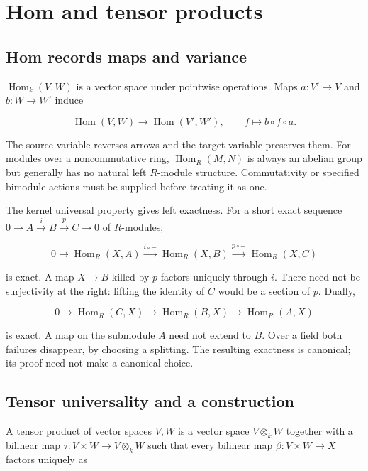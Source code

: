 \documentclass[
  11pt,
]{article}
\begin{document}
\section{Hom and tensor products}\label{hom-and-tensor-products}

\subsection{Hom records maps and
variance}\label{hom-records-maps-and-variance}

\(\operatorname{Hom}_k(V,W)\) is a vector space under pointwise
operations. Maps \(a:V'\to V\) and \(b:W\to W'\) induce

\[\operatorname{Hom}(V,W)\to\operatorname{Hom}(V',W'),
\qquad f\longmapsto b\circ f\circ a.\]

The source variable reverses arrows and the target variable preserves
them. For modules over a noncommutative ring,
\(\operatorname{Hom}_R(M,N)\) is always an abelian group but generally
has no natural left \(R\)-module structure. Commutativity or specified
bimodule actions must be supplied before treating it as one.

The kernel universal property gives left exactness. For a short exact
sequence \(0\to A\xrightarrow{i}B\xrightarrow{p}C\to0\) of
\(R\)-modules,

\[0\to\operatorname{Hom}_R(X,A)\xrightarrow{i\circ-}
\operatorname{Hom}_R(X,B)\xrightarrow{p\circ-}
\operatorname{Hom}_R(X,C)\]

is exact. A map \(X\to B\) killed by \(p\) factors uniquely through
\(i\). There need not be surjectivity at the right: lifting the identity
of \(C\) would be a section of \(p\). Dually,

\[0\to\operatorname{Hom}_R(C,X)\to\operatorname{Hom}_R(B,X)
\to\operatorname{Hom}_R(A,X)\]

is exact. A map on the submodule \(A\) need not extend to \(B\). Over a
field both failures disappear, by choosing a splitting. The resulting
exactness is canonical; its proof need not make a canonical choice.

\subsection{Tensor universality and a
construction}\label{tensor-universality-and-a-construction}

A tensor product of vector spaces \(V,W\) is a vector space
\(V\otimes_k W\) together with a bilinear map
\(\tau:V\times W\to V\otimes_k W\) such that every bilinear map
\(\beta:V\times W\to X\) factors uniquely as
\end{document}
